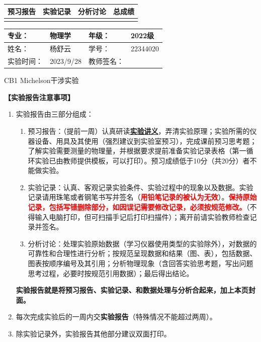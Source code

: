 \documentclass[dvipsnames, svgnames,a4paper,11pt]{article}
\begin{document}
	
	
	
	\begin{table}
		\renewcommand\arraystretch{1.7}
		\begin{tabularx}{\textwidth}{
				|X|X|X|X
				|X|X|X|X|}
			\hline
			\multicolumn{2}{|c|}{预习报告}&\multicolumn{2}{|c|}{实验记录}&\multicolumn{2}{|c|}{分析讨论}&\multicolumn{2}{|c|}{总成绩}\\
			\hline
			& & & & & & & \\
			\hline
		\end{tabularx}
	\end{table}
	
	\begin{table}
		\renewcommand\arraystretch{1.7}
		\begin{tabularx}{\textwidth}{|X|X|X|X|}
			\hline
			专业： & 物理学 &年级： & 2022级\\
			\hline
			姓名： & 杨舒云  & 学号： & 22344020\\
			\hline
			实验时间： & 2023/9/28 & 教师签名： & \\
			\hline
		\end{tabularx}
	\end{table}
	
	\begin{center}
		\LARGE CB1 \quad Michelson干涉实验
	\end{center}
	
	\textbf{【实验报告注意事项】}
	\begin{enumerate}
		\item 实验报告由三部分组成：
		\begin{enumerate}
			\item 预习报告：（提前一周）认真研读\underline{\textbf{实验讲义}}，弄清实验原理；实验所需的仪器设备、用具及其使用（强烈建议到实验室预习），完成课前预习思考题；了解实验需要测量的物理量，并根据要求提前准备实验记录表格（第一循环实验已由教师提供模板，可以打印）。预习成绩低于10分（共20分）者不能做实验。
			\item 实验记录：认真、客观记录实验条件、实验过程中的现象以及数据。实验记录请用珠笔或者钢笔书写并签名（\textcolor{red}{\textbf{用铅笔记录的被认为无效}}）。\textcolor{red}{\textbf{保持原始记录，包括写错删除部分，如因误记需要修改记录，必须按规范修改。}}（不得输入电脑打印，但可扫描手记后打印扫描件）；离开前请实验教师检查记录并签名。
			\item 分析讨论：处理实验原始数据（学习仪器使用类型的实验除外），对数据的可靠性和合理性进行分析；按规范呈现数据和结果（图、表），包括数据、图表按顺序编号及其引用；分析物理现象（含回答实验思考题，写出问题思考过程，必要时按规范引用数据）；最后得出结论。
		\end{enumerate}
		\textbf{实验报告就是将预习报告、实验记录、和数据处理与分析合起来，加上本页封面。}
		\item 每次完成实验后的一周内交\textbf{实验报告}（特殊情况不能超过两周）。
		\item 除实验记录外，实验报告其他部分建议双面打印。
	\end{enumerate}
	
\end{document}
